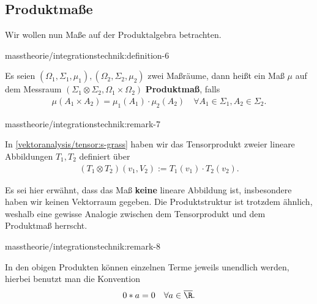 \documentclass[letterpaper,10pt,german]{jupyterBook}
\begin{document}
\subsection{Produktmaße}
\label{\detokenize{masstheorie/integrationstechnik:produktmasze}}
\par
Wir wollen nun Maße auf der Produktalgebra betrachten.
\begin{definition}{}{masstheorie/integrationstechnik:definition-6}



\par
Es seien \((\Omega_1,\Sigma_1,\mu_1), (\Omega_2,\Sigma_2,\mu_2)\) zwei Maßräume, dann heißt ein Maß \(\mu\) auf dem Messraum \((\Sigma_1\otimes\Sigma_2, \Omega_1\times\Omega_2)\) \textbf{Produktmaß}, falls
\begin{align*}
\mu(A_1\times A_2) = \mu_1(A_1)\cdot\mu_2(A_2)\quad\forall A_1\in\Sigma_1, A_2\in\Sigma_2.
\end{align*}\end{definition}
\begin{remark}{}{masstheorie/integrationstechnik:remark-7}



\par
In \cref{vektoranalysis/tensor:s-grass}  haben wir das Tensorprodukt zweier lineare Abbildungen \(T_1,T_2\) definiert über
\begin{align*}
(T_1\otimes T_2)(v_1,V_2) := T_1(v_1)\cdot T_2(v_2).
\end{align*}
\par
Es sei hier erwähnt, dass das Maß \textbf{keine} lineare Abbildung ist, insbesondere haben wir keinen Vektorraum gegeben. Die Produktstruktur ist trotzdem ähnlich, weshalb eine gewisse Analogie zwischen dem Tensorprodukt und dem Produktmaß herrscht.
\end{remark}
\begin{remark}{}{masstheorie/integrationstechnik:remark-8}



\par
In den obigen Produkten können einzelnen Terme jeweils unendlich werden, hierbei benutzt man die Konvention
\begin{align*}
0 * a = 0\quad\forall a\in\overline{\R}.
\end{align*}\end{remark}
\end{document}
